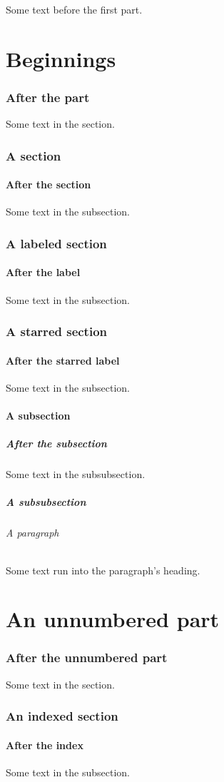 \documentclass{article}
\begin{document}
Some text before the first part.
\part{Beginnings}
\section{After the part}
Some text in the section.
\section{A section}
\subsection{After the section}
Some text in the subsection.
\section{A labeled section}\label{labeled}
\subsection{After the label}
Some text in the subsection.
\section*{A starred section}\label{starred}
\subsection*{After the starred label}
Some text in the subsection.
\subsection{A subsection}
\subsubsection{After the subsection}
Some text in the subsubsection.
\subsubsection{A subsubsection}
\paragraph{A paragraph} Some text run into the paragraph's heading.
\part*{An unnumbered part}\label{unnumbered}
\section{After the unnumbered part}
Some text in the section.
\section{An indexed section}
\subsection{After the index}
Some text in the subsection.
\end{document}
